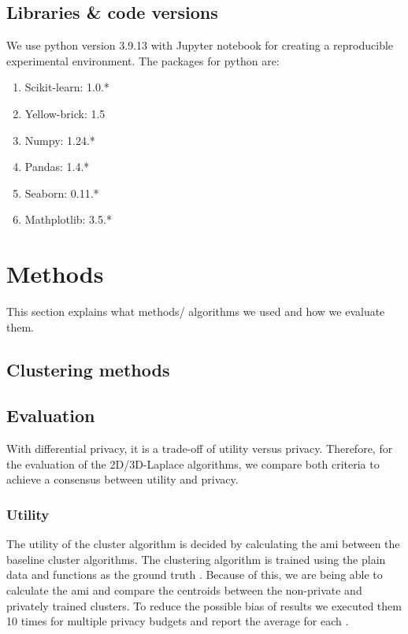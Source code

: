 \subsection{Libraries \& code versions}
We use python version 3.9.13 with Jupyter notebook for creating a reproducible experimental environment.
The packages for python are:
\begin{enumerate}
  \item Scikit-learn: 1.0.*
  \item Yellow-brick: 1.5
  \item Numpy: 1.24.*
  \item Pandas: 1.4.*
  \item Seaborn: 0.11.*
  \item Mathplotlib: 3.5.*
\end{enumerate}

\section{Methods}
This section explains what methods/ algorithms we used and how we evaluate them.
\subsection{Clustering methods}
\subsection{Evaluation}
With differential privacy, it is a trade-off of utility versus privacy.
Therefore, for the evaluation of the 2D/3D-Laplace algorithms, we compare both criteria to achieve a consensus between utility and privacy.
\subsubsection{Utility}
The utility of the cluster algorithm is decided by calculating the \gls{ami} between the baseline cluster algorithms.
The clustering algorithm is trained using the plain data and functions as the ground truth \citep{9646464,sun_distributed_2019}.
Because of this, we are being able to calculate the \gls{ami} and compare the centroids between the non-private and privately trained clusters.
To reduce the possible bias of results we executed them 10 times for multiple privacy budgets and report the average for each \citep{9679364}.

